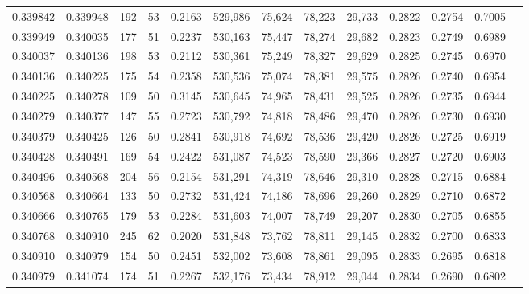 \begin{tabular}{rrrrrrrrrrrrr}
0.339842 & 0.339948 &   192 &  53 &                                     0.2163 & 529,986 &  75,624 &  78,223 &  29,733 & 0.2822 & 0.2754 & 0.7005 \\
0.339949 & 0.340035 &   177 &  51 &                                     0.2237 & 530,163 &  75,447 &  78,274 &  29,682 & 0.2823 & 0.2749 & 0.6989 \\
0.340037 & 0.340136 &   198 &  53 &                                     0.2112 & 530,361 &  75,249 &  78,327 &  29,629 & 0.2825 & 0.2745 & 0.6970 \\
0.340136 & 0.340225 &   175 &  54 &                                     0.2358 & 530,536 &  75,074 &  78,381 &  29,575 & 0.2826 & 0.2740 & 0.6954 \\
0.340225 & 0.340278 &   109 &  50 &                                     0.3145 & 530,645 &  74,965 &  78,431 &  29,525 & 0.2826 & 0.2735 & 0.6944 \\
0.340279 & 0.340377 &   147 &  55 &                                     0.2723 & 530,792 &  74,818 &  78,486 &  29,470 & 0.2826 & 0.2730 & 0.6930 \\
0.340379 & 0.340425 &   126 &  50 &                                     0.2841 & 530,918 &  74,692 &  78,536 &  29,420 & 0.2826 & 0.2725 & 0.6919 \\
0.340428 & 0.340491 &   169 &  54 &                                     0.2422 & 531,087 &  74,523 &  78,590 &  29,366 & 0.2827 & 0.2720 & 0.6903 \\
0.340496 & 0.340568 &   204 &  56 &                                     0.2154 & 531,291 &  74,319 &  78,646 &  29,310 & 0.2828 & 0.2715 & 0.6884 \\
0.340568 & 0.340664 &   133 &  50 &                                     0.2732 & 531,424 &  74,186 &  78,696 &  29,260 & 0.2829 & 0.2710 & 0.6872 \\
0.340666 & 0.340765 &   179 &  53 &                                     0.2284 & 531,603 &  74,007 &  78,749 &  29,207 & 0.2830 & 0.2705 & 0.6855 \\
0.340768 & 0.340910 &   245 &  62 &                                     0.2020 & 531,848 &  73,762 &  78,811 &  29,145 & 0.2832 & 0.2700 & 0.6833 \\
0.340910 & 0.340979 &   154 &  50 &                                     0.2451 & 532,002 &  73,608 &  78,861 &  29,095 & 0.2833 & 0.2695 & 0.6818 \\
0.340979 & 0.341074 &   174 &  51 &                                     0.2267 & 532,176 &  73,434 &  78,912 &  29,044 & 0.2834 & 0.2690 & 0.6802 \\

\end{tabular}
